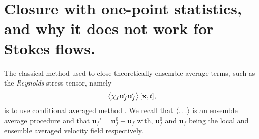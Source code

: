 \section{Closure with one-point statistics, and why it does not work for Stokes flows.}

The classical method used to close theoretically ensemble average terms, such as the \textit{Reynolds} stress tensor, namely 
\begin{equation*}
    \left<\chi_f \textbf{u}_f' \textbf{u}_f'\right>[\textbf{x},t],
\end{equation*} 
is to use conditional averaged method \citet{van1998pseudo,zhang1994ensemble}.
We recall that $\left<\ldots\right>$ is an ensemble average procedure and that $\textbf{u}_f' = \textbf{u}_f^0 - \textbf{u}_f$ with,  $\textbf{u}_f^0$ and $\textbf{u}_f$ being the local and ensemble averaged velocity field respectively.

